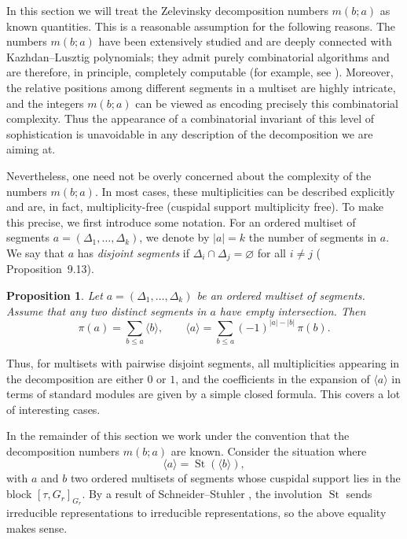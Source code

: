 \documentclass[12pt]{article}
\newtheorem{proposition}[theorem]{Proposition}
\theoremstyle{remark}
\begin{document}
In this section we will treat the Zelevinsky decomposition numbers $m(b;a)$ as known quantities. This is a reasonable assumption for the following reasons. The numbers $m(b;a)$ have been extensively studied and are deeply connected with Kazhdan--Lusztig polynomials; they admit purely combinatorial algorithms and are therefore, in principle, completely computable (for example, see \cite{Deng2023}). Moreover, the relative positions among different segments in a multiset are highly intricate, and the integers $m(b;a)$ can be viewed as encoding precisely this combinatorial complexity. Thus the appearance of a combinatorial invariant of this level of sophistication is unavoidable in any description of the decomposition we are aiming at.

Nevertheless, one need not be overly concerned about the complexity of the numbers $m(b;a)$. In most cases, these multiplicities can be described explicitly and are, in fact, multiplicity-free (cuspidal support multiplicity free). To make this precise, we first introduce some notation. For an ordered multiset of segments $a = (\Delta_1,\dots,\Delta_k)$, we denote by $|a| = k$ the number of segments in $a$. We say that $a$ has \emph{disjoint segments} if $\Delta_i \cap \Delta_j = \varnothing$ for all $i \neq j$ (\cite{Zelevinsky1980} Proposition~9.13).

\begin{proposition}\label{prop:disjoint-segments}
Let $a = (\Delta_1,\dots,\Delta_k)$ be an ordered multiset of segments. Assume that any two distinct segments in $a$ have empty intersection. Then
$$
\pi(a) = \sum_{b \le a} \langle b \rangle,
\qquad
\langle a \rangle = \sum_{b \le a} (-1)^{|a| - |b|} \, \pi(b).
$$
\end{proposition}

Thus, for multisets with pairwise disjoint segments, all multiplicities appearing in the decomposition are either $0$ or $1$, and the coefficients in the expansion of $\langle a \rangle$ in terms of standard modules are given by a simple closed formula. This covers a lot of interesting cases.

In the remainder of this section we work under the convention that the decomposition numbers $m(b;a)$ are known. Consider the situation where
$$
\langle a \rangle = \operatorname{St}(\langle b \rangle),
$$
with $a$ and $b$ two ordered multisets of segments whose cuspidal support lies in the block $[\tau, G_r]_{G_r}$. By a result of Schneider--Stuhler \cite{SchneiderStuhler1997}, the involution $\operatorname{St}$ sends irreducible representations to irreducible representations, so the above equality makes sense.
\end{document}
